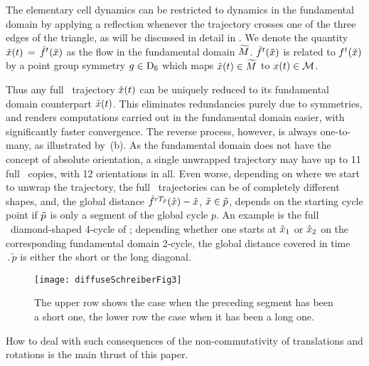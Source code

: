The elementary cell dynamics can be restricted to dynamics in the
fundamental domain by applying a reflection whenever the trajectory
crosses one of the three edges of the triangle, as will be discussed in
detail in . We denote the quantity
$\tilde x(t)\,=\,{\tilde{f}^{t}(\tilde x)}$ as the flow in the fundamental domain ${\widetilde M}$.
${\tilde{f}^{t}(\tilde x)}$ is related to ${f^{t}(\tilde x)}$ by a point group symmetry
$g \in \textrm{D}_{6}$ which maps $\tilde x(t)\in{\widetilde M}$ to ${x}(t) \in {\ensuremath{{\cal M}}}$.

Thus any full \statesp\ trajectory $\hat x(t)$ can be uniquely reduced to
its fundamental domain counterpart $\tilde x(t)$. This eliminates redundancies
purely due to symmetries, and renders computations carried out in the
fundamental domain easier, with significantly faster convergence. The
reverse process, however, is always one-to-many, as illustrated by
\,(b).
As the fundamental domain does not have
the concept of absolute orientation, a single unwrapped trajectory may
have up to 11 full \statesp\ copies, with 12 orientations in all. Even worse,
depending on where we start to unwrap the trajectory, the full \statesp\
trajectories can be of completely different shapes, and, the global distance
$ \hat f^{r {T_{\tilde{p}}}} (\tilde x{}) - \tilde x{} $,
$\tilde x{} \in {\tilde p}$,
depends on the starting cycle point if
${\tilde p}$ is only a segment of the global cycle $p$. An
example is the full \statesp\ diamond-shaped 4-cycle of ; %
depending whether one starts at $\tilde x_1$ or $\tilde x_2$ on the
corresponding fundamental domain 2-cycle, the global
distance covered in time $\period{\tilde{p}}$ is either the short or the
long diagonal.

\begin{figure}
\begin{center}
\texttt{[image: diffuseSchreiberFig3]}
\end{center}
\caption{
The upper row shows the case when the preceding
segment has been a short one,
the lower row the case when it has been a long one.
    }
\label{schreiberFig3}
\end{figure}


How to deal with such consequences of the non-commutativity of
translations and rotations is the main thrust of this paper.

